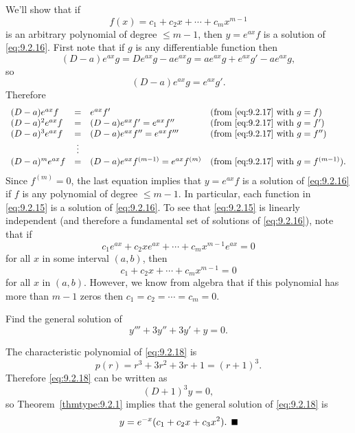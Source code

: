 \proof We'll show that if
\[
  f(x)=c_{1}+c_{2}x+\cdots+c_{m}x^{m-1}
\]
is an arbitrary polynomial of degree $\le m-1$, then $y=e^{ax}f$ is a solution of \eqref{eq:9.2.16}.
First note that if $g$ is any differentiable function then
\[
  (D-a)e^{ax}g=De^{ax}g-ae^{ax}g=ae^{ax}g+e^{ax}g'-ae^{ax}g,
\]
so
\begin{equation}
  \label{eq:9.2.17}(D-a)e^{ax}g=e^{ax}g'.
\end{equation}
Therefore
\[
  \begin{array}{lcll}
    (D-a)e^{ax}f     & =      & e^{ax}f'                           & \mbox{(from \eqref{eq:9.2.17} with $g=f$)}          \\
    (D-a)^{2}e^{ax}f & =      & (D-a)e^{ax}f'=e^{ax}f''            & \mbox{(from \eqref{eq:9.2.17} with $g=f'$)}         \\
    (D-a)^{3}e^{ax}f & =      & (D-a)e^{ax}f''=e^{ax}f'''          & \mbox{(from \eqref{eq:9.2.17} with $g=f''$)}        \\
                     & \vdots &                                     \\
    (D-a)^{m}e^{ax}f & =      & (D-a)e^{ax}f^{(m-1)}=e^{ax}f^{(m)} & \mbox{(from \eqref{eq:9.2.17} with $g=f^{(m-1)}$)}.
  \end{array}
\]
Since $f^{(m)}=0$, the last equation implies that $y=e^{ax}f$ is a solution of \eqref{eq:9.2.16} if
$f$ is any polynomial of degree $\le m-1$. In particular, each function in \eqref{eq:9.2.15} is a
solution of \eqref{eq:9.2.16}. To see that \eqref{eq:9.2.15} is linearly independent (and therefore
a fundamental set of solutions of \eqref{eq:9.2.16}), note that if
\[
  c_{1}e^{ax}+c_{2}xe^{ax}+\cdots+c_{m}x^{m-1}e^{ax}=0
\]
for all $x$ in some interval $(a,b)$, then
\[
  c_{1}+c_{2}x+\cdots+c_{m}x^{m-1}=0
\]
for all $x$ in $(a,b)$. However, we know from algebra that if this polynomial has more than $m-1$
zeros then $c_{1}=c_{2}=\cdots=c_{m}=0$.

\begin{example}
  \label{example:9.2.5} \rm Find the general solution of
  \begin{equation}
    \label{eq:9.2.18}y'''+3y''+3y'+y=0.
  \end{equation}
\end{example}

\begin{examplesolution}
\solution The characteristic polynomial of \eqref{eq:9.2.18} is
\[
  p(r)=r^{3}+3r^{2}+3r+1=(r+1)^{3}.
\]
Therefore \eqref{eq:9.2.18} can be written as
\[
  (D+1)^{3}y=0,
\]
so Theorem~\ref{thmtype:9.2.1} implies that the general solution of \eqref{eq:9.2.18} is
\[
  y=e^{-x}(c_{1}+c_{2}x+c_{3}x^{2}).\bbox
\]
\end{examplesolution}

